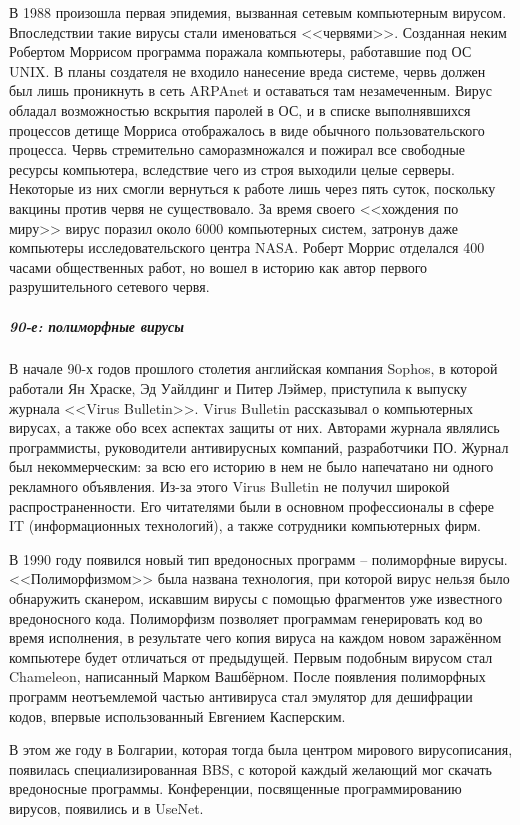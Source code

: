 В 1988 произошла первая эпидемия, вызванная сетевым компьютерным вирусом.
Впоследствии такие вирусы стали именоваться <<червями>>. Созданная неким
Робертом Моррисом программа поражала компьютеры, работавшие под ОС UNIX. В
планы создателя не входило нанесение вреда системе, червь должен был лишь
проникнуть в сеть ARPAnet и оставаться там незамеченным. Вирус обладал
возможностью вскрытия паролей в ОС, и в списке выполнявшихся процессов детище
Морриса отображалось в виде обычного пользовательского процесса. Червь
стремительно саморазмножался и пожирал все свободные ресурсы компьютера,
вследствие чего из строя выходили целые серверы. Некоторые из них смогли
вернуться к работе лишь через пять суток, поскольку вакцины против червя не
существовало. За время своего <<хождения по миру>> вирус поразил около 6000
компьютерных систем, затронув даже компьютеры исследовательского центра NASA.
Роберт Моррис отделался 400 часами общественных работ, но вошел в историю как
автор первого разрушительного сетевого червя.
%
\subparagraph{90-е: полиморфные вирусы}
%
В начале 90-х годов прошлого столетия английская компания Sophos, в которой
работали Ян Храске, Эд Уайлдинг и Питер Лэймер, приступила к выпуску журнала
<<Virus Bulletin>>. Virus Bulletin рассказывал о компьютерных вирусах, а
также обо всех аспектах защиты от них. Авторами журнала являлись
программисты, руководители антивирусных компаний, разработчики ПО. Журнал был
некоммерческим: за всю его историю в нем не было напечатано ни одного
рекламного объявления. Из-за этого Virus Bulletin не получил широкой
распространенности. Его читателями были в основном профессионалы в сфере IT
(информационных технологий), а также сотрудники компьютерных фирм.

В 1990 году появился новый тип вредоносных программ – полиморфные вирусы.
<<Полиморфизмом>> была названа технология, при которой вирус нельзя было
обнаружить сканером, искавшим вирусы с помощью фрагментов уже известного
вредоносного кода. Полиморфизм позволяет программам генерировать код во время
исполнения, в результате чего копия вируса на каждом новом заражённом
компьютере будет отличаться от предыдущей. Первым подобным вирусом стал
Chameleon, написанный Марком Вашбёрном. После появления полиморфных программ
неотъемлемой частью антивируса стал эмулятор для дешифрации кодов, впервые
использованный Евгением Касперским.

В этом же году в Болгарии, которая тогда была центром мирового вирусописания,
появилась специализированная BBS, с которой каждый желающий мог скачать
вредоносные программы. Конференции, посвященные программированию вирусов,
появились и в UseNet.

